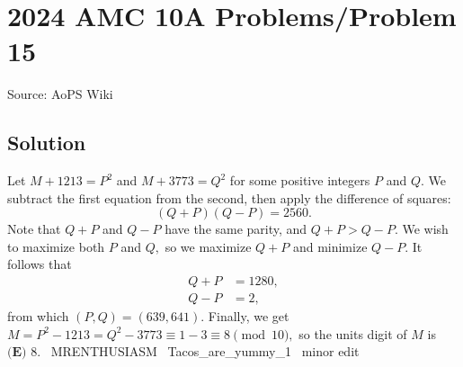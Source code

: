 \documentclass[12pt]{article}
\begin{document}
\section*{{2024 AMC 10A Problems/Problem 15}}
Source: AoPS Wiki

\subsection*{Solution}
Let $M+1213=P^2$ and $M+3773=Q^2$ for some positive integers $P$ and $Q.$ We subtract the first equation from the second, then apply the difference of squares: \[(Q+P)(Q-P)=2560.\] Note that $Q+P$ and $Q-P$ have the same parity, and $Q+P>Q-P.$ We wish to maximize both $P$ and $Q,$ so we maximize $Q+P$ and minimize $Q-P.$ It follows that \begin{align*} Q+P&=1280, \\ Q-P&=2, \end{align*} from which $(P,Q)=(639,641).$ Finally, we get $M=P^2-1213=Q^2-3773\equiv1-3\equiv8\pmod{10},$ so the units digit of $M$ is $\boxed{\textbf{(E) }8}.$ ~MRENTHUSIASM ~Tacos_are_yummy_1 ~minor edit
\end{document}
